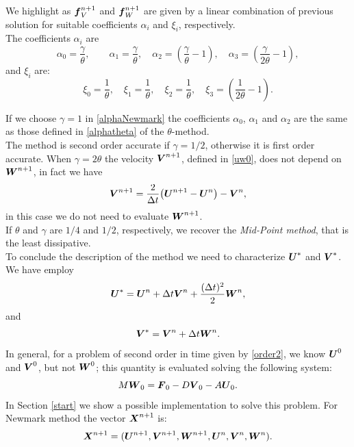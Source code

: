 \documentclass[english,a4paper]{article}
\newcommand{\Xbf}{\text{\mbox{\boldmath $X$}}}
\newcommand{\Ubf}{\text{\mbox{\boldmath $U$}}}
\newcommand{\Abf}{\text{\mbox{\boldmath $W$}}}
\newcommand{\fbf}{\text{\mbox{\boldmath $f$}}}
\newcommand{\Fbf}{\text{\mbox{\boldmath $F$}}}
\newcommand{\Wbf}{\text{\mbox{\boldmath $V$}}}
\begin{document}
 We highlight as $\fbf_V^{n+1}$ and $\fbf_W^{n+1}$ are given by a linear
 combination of previous solution for  suitable coefficients $\alpha_i$
 and $\xi_i$, respectively. \\
The coefficients $\alpha_i$ are
\begin{equation}\label{alphaNewmark}
\displaystyle\alpha_{0}=\frac{\gamma}{\theta}, \qquad
\displaystyle\alpha_{1}=\frac{\gamma}{\theta},
\quad\displaystyle\alpha_2=\left(\frac{\gamma}{\theta}-1\right),\quad
\displaystyle\alpha_3=\left(\frac{\gamma}{2\theta}-1\right),
\end{equation}
and $\xi_i$ are:
\begin{equation}\label{xiNewmark}
\xi_{0}=\frac{1}{\theta},\quad\displaystyle\xi_{1}=\frac{1}{\theta},
\quad \displaystyle\xi_2=\frac{1}{\theta},\quad
\displaystyle\xi_3=(\frac{1}{2\theta}-1).
\end{equation}

If we choose $\gamma=1$ in \eqref{alphaNewmark} the coefficients
$\alpha_0$, $\alpha_1$ and $\alpha_2$ are the same as those defined in
\eqref{alphatheta} of the
$\theta$-method.\\
The method is second order  accurate if  $\gamma=1/2$,
otherwise it is  first order accurate.
 When $\gamma=2\theta$ the velocity $\Wbf^{n+1}$, defined in
 \eqref{uw0}, does not depend on $\Abf^{n+1}$, in fact we have
\begin{equation*}
\Wbf^{n+1}=\frac{2}{\Delta
  t}\big(\Ubf^{n+1}-\Ubf^n\big)-\Wbf^{n},
\end{equation*}
in this case we do not need to evaluate $\Abf^{n+1}$.\\
 If $\theta$ and   $\gamma$ are $1/4$ and $1/2$, respectively, we recover the
\emph{Mid-Point method}, that is the least dissipative.
\\
To conclude the description of the method we need to characterize
$\Ubf^*$ and $\Wbf^*$. We have employ
$$\Ubf^*=\Ubf^n + \Delta t \Wbf^n + \frac{(\Delta t)^2}{2} \Abf^n, $$
and
$$ \Wbf^*= \Wbf^n + \Delta t \Abf^{n}. $$
In general, for a problem of second order in time given by \eqref{order2}, we
know  $\Ubf^0$ and $\Wbf^0$, but not $\Abf^0$; this quantity is
evaluated solving  the following system:
 $$M \Abf_0= \Fbf_0 - D \Wbf_0 - A \Ubf_0.$$
In  Section \ref{start} we show a possible implementation to solve
this problem.
For  Newmark method the vector $\Xbf^{n+1}$ is:
$$\Xbf^{n+1}=(\Ubf^{n+1},\Wbf^{n+1}, \Abf^{n+1}, \Ubf^n, \Wbf^n, \Abf^n).$$
\end{document}
